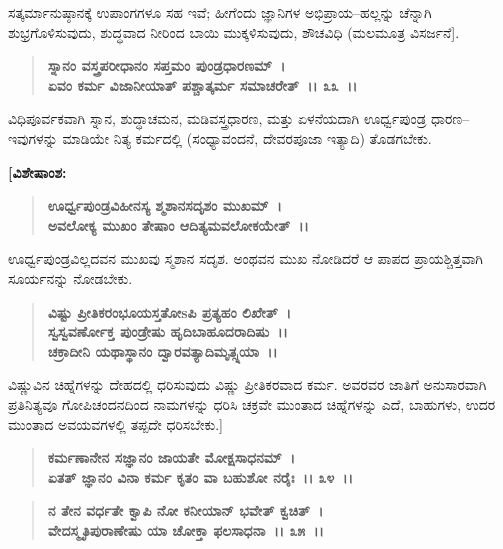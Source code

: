 ಸತ್ಕರ್ಮಾನುಷ್ಠಾನಕ್ಕೆ ಉಪಾಂಗಗಳೂ ಸಹ ಇವೆ; ಹೀಗೆಂದು ಜ್ಞಾನಿಗಳ ಅಭಿಪ್ರಾಯ–\-ಹಲ್ಲನ್ನು ಚೆನ್ನಾಗಿ ಶುಭ್ರಗೊಳಿಸುವುದು, ಶುದ್ಧವಾದ ನೀರಿಂದ ಬಾಯಿ ಮುಕ್ಕಳಿಸುವುದು, ಶೌಚವಿಧಿ (ಮಲಮೂತ್ರ ವಿಸರ್ಜನೆ].

\begin{verse}
\textbf{ಸ್ನಾನಂ ವಸ್ತ್ರಪರೀಧಾನಂ ಸಪ್ತಮಂ ಪುಂಡ್ರಧಾರಣಮ್~।}\\\textbf{ಏವಂ ಕರ್ಮ ವಿಜಾನೀಯಾತ್ ಪಶ್ಚಾತ್ಕರ್ಮ ಸಮಾಚರೇತ್~।। ೩೩~।।}
\end{verse}

ವಿಧಿಪೂರ್ವಕವಾಗಿ ಸ್ನಾನ, ಶುದ್ಧಾಚಮನ, ಮಡಿವಸ್ತ್ರಧಾರಣ, ಮತ್ತು ಏಳನೆಯದಾಗಿ ಊರ್ಧ್ವಪುಂಡ್ರ ಧಾರಣ–ಇವುಗಳನ್ನು ಮಾಡಿಯೇ ನಿತ್ಯ ಕರ್ಮದಲ್ಲಿ (ಸಂಧ್ಯಾವಂದನೆ, ದೇವರ\-ಪೂಜಾ ಇತ್ಯಾದಿ) ತೊಡಗಬೇಕು.

\begin{flushleft}
\textbf{[ವಿಶೇಷಾಂಶ:}
\end{flushleft}

\begin{verse}
\textbf{ಊರ್ಧ್ವಪುಂಡ್ರವಿಹೀನಸ್ಯ ಶ್ಮಶಾನಸದೃಶಂ ಮುಖಮ್~।}\\\textbf{ಅವಲೋಕ್ಯ ಮುಖಂ ತೇಷಾಂ ಆದಿತ್ಯಮವಲೋಕಯೇತ್~।।}
\end{verse}

ಊರ್ಧ್ವಪುಂಡ್ರವಿಲ್ಲದವನ ಮುಖವು ಸ್ಮಶಾನ ಸದೃಶ. ಅಂಥವನ ಮುಖ ನೋಡಿದರೆ ಆ ಪಾಪದ ಪ್ರಾಯಶ್ಚಿತ್ತವಾಗಿ ಸೂರ್ಯನನ್ನು ನೋಡಬೇಕು.

\begin{verse}
\textbf{ವಿಷ್ಟು ಪ್ರೀತಿಕರಂಭೂಯಸ್ತತೋsಪಿ ಪ್ರತ್ಯಹಂ ಲಿಖೇತ್~।}\\\textbf{ಸ್ವಸ್ವವರ್ಣೋಕ್ತ ಪುಂಡ್ರೇಷು ಹೃದಿಬಾಹೂದರಾದಿಷು~।। }\\\textbf{ಚಕ್ರಾದೀನಿ ಯಥಾಸ್ಥಾನಂ ದ್ವಾರವತ್ಯಾದಿಮೃತ್ಸ್ನಯಾ~।।} 
\end{verse}

ವಿಷ್ಣುವಿನ ಚಿಹ್ನೆಗಳನ್ನು ದೇಹದಲ್ಲಿ ಧರಿಸುವುದು ವಿಷ್ಣು ಪ್ರೀತಿಕರವಾದ ಕರ್ಮ. ಅವರವರ ಜಾತಿಗೆ ಅನುಸಾರವಾಗಿ ಪ್ರತಿನಿತ್ಯವೂ ಗೋಪಿಚಂದನದಿಂದ ನಾಮಗಳನ್ನು ಧರಿಸಿ ಚಕ್ರವೇ ಮುಂತಾದ ಚಿಹ್ನೆಗಳನ್ನು ಎದೆ, ಬಾಹುಗಳು, ಉದರ ಮುಂತಾದ ಅವಯವಗಳಲ್ಲಿ ತಪ್ಪದೇ ಧರಿಸಬೇಕು.]

\begin{verse}
\textbf{ಕರ್ಮಣಾನೇನ ಸಜ್ಞಾನಂ ಜಾಯತೇ ಮೋಕ್ಷಸಾಧನಮ್~।}\\\textbf{ಏತತ್ ಜ್ಞಾನಂ ವಿನಾ ಕರ್ಮ ಕೃತಂ ವಾ ಬಹುಶೋ ನರೈಃ~।। ೩೪~।। }
\end{verse}

\begin{verse}
\textbf{ನ ತೇನ ವರ್ಧತೇ ಕ್ವಾಪಿ ನೋ ಕನೀಯಾನ್ ಭವೇತ್ ಕ್ವಚಿತ್~।}\\\textbf{ವೇದಸ್ಮೃತಿಪುರಾಣೇಷು ಯಾ ಚೋಕ್ತಾ ಫಲಸಾಧನಾ~।। ೩೫~।।}
\end{verse}

